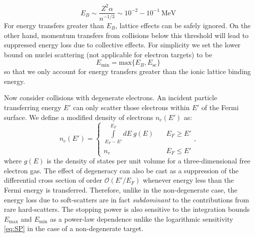 \documentclass[twocolumn,showpacs,preprintnumbers,amsmath,amssymb,prd]{revtex4}
\begin{document}
\begin{appendices}
\begin{equation}
\label{eq:lattice}
E_B \sim \frac{Z^2 \alpha}{n^{-1/3}} \sim 10^{-2} - 10^{-1} ~\text{MeV}
\end{equation}
For energy transfers greater than $E_B$, lattice effects can be safely ignored. On the other hand, momentum transfers from collisions below this threshold will lead to suppressed energy loss due to collective effects. For simplicity we set the lower bound on nuclei scattering (not applicable for electron targets) to be
\begin{equation}
E_{\text{min}} = \text{max} \{E_B,E_{\text{sc}}\}
\end{equation}
so that we only account for energy transfers greater than the ionic lattice binding energy.

Now consider collisions with degenerate electrons. An incident particle transferring energy $E'$ can only scatter those electrons within $E'$ of the Fermi surface. We define a modified density of electrons $n_e(E')$ as:
\begin{equation}
n_e(E') = \left\{
        \begin{array}{ll}
            \displaystyle \int \limits_{E_F -E'}^{E_F}dE ~g(E) & \quad E_F \geq E' \\
            n_e & \quad E_F \leq E'
        \end{array}
    \right.,
\end{equation}
where $g(E)$ is the density of states per unit volume for a three-dimensional free electron gas. The effect of degeneracy can also be cast as a suppression of the differential cross section of order $\mathcal{O}(E'/E_F)$ whenever energy less than the Fermi energy is transferred. Therefore, unlike in the non-degenerate case, the energy loss due to soft-scatters are in fact \emph{subdominant} to the contributions from rare hard-scatters. The stopping power is also sensitive to the integration bounds $E_{\text{max}}$ and $E_{\text{min}}$ as a power-law dependence unlike the logarithmic sensitivity \eqref{eq:SP} in the case of a non-degenerate target.


\end{appendices}
\end{document}
